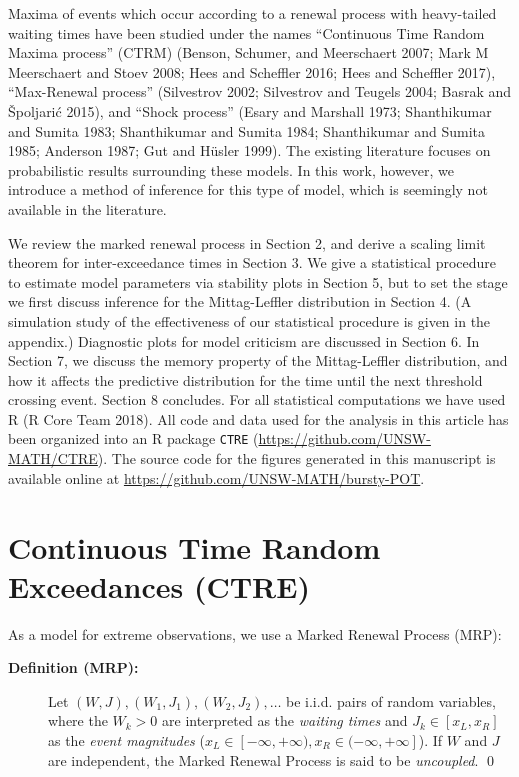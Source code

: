 \documentclass[smallextended]{svjour3}       %
\begin{document}
Maxima of events which occur according to a renewal process with
heavy-tailed waiting times have been studied under the names
``Continuous Time Random Maxima process'' (CTRM) (Benson, Schumer, and
Meerschaert 2007; Mark M Meerschaert and Stoev 2008; Hees and Scheffler
2016; Hees and Scheffler 2017), ``Max-Renewal process'' (Silvestrov
2002; Silvestrov and Teugels 2004; Basrak and Špoljarić 2015), and
``Shock process'' (Esary and Marshall 1973; Shanthikumar and Sumita
1983; Shanthikumar and Sumita 1984; Shanthikumar and Sumita 1985;
Anderson 1987; Gut and Hüsler 1999). The existing literature focuses on
probabilistic results surrounding these models. In this work, however,
we introduce a method of inference for this type of model, which is
seemingly not available in the literature.

We review the marked renewal process in Section 2, and derive a scaling
limit theorem for inter-exceedance times in Section 3. We give a
statistical procedure to estimate model parameters via stability plots
in Section 5, but to set the stage we first discuss inference for the
Mittag-Leffler distribution in Section 4. (A simulation study of the
effectiveness of our statistical procedure is given in the appendix.)
Diagnostic plots for model criticism are discussed in Section 6. In
Section 7, we discuss the memory property of the Mittag-Leffler
distribution, and how it affects the predictive distribution for the
time until the next threshold crossing event. Section 8 concludes. For
all statistical computations we have used R (R Core Team 2018). All code
and data used for the analysis in this article has been organized into
an R package \texttt{CTRE} (\url{https://github.com/UNSW-MATH/CTRE}).
The source code for the figures generated in this manuscript is
available online at \url{https://github.com/UNSW-MATH/bursty-POT}.

\section{Continuous Time Random Exceedances
(CTRE)}\label{continuous-time-random-exceedances-ctre}

As a model for extreme observations, we use a Marked Renewal Process
(MRP):

\begin{description}
\item[\textbf{Definition (MRP):}]
Let \((W,J), (W_1, J_1), (W_2, J_2), \ldots\) be i.i.d. pairs of random
variables, where the \(W_k > 0\) are interpreted as the \emph{waiting
times} and \(J_k \in [x_L, x_R]\) as the \emph{event magnitudes}
(\(x_L \in [-\infty, +\infty), x_R \in (-\infty, +\infty]\)). If \(W\)
and \(J\) are independent, the Marked Renewal Process is said to be
\emph{uncoupled}. \qed
\end{description}
\end{document}
